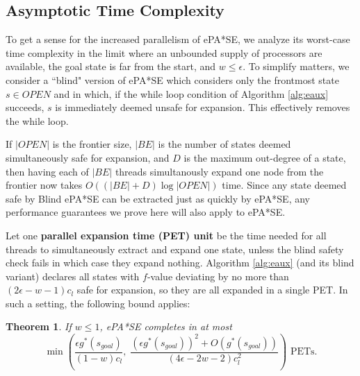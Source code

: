 \documentclass[letterpaper]{article}
\newtheorem{thm}{Theorem}
\begin{document}
\subsection{Asymptotic Time Complexity}

To get a sense for the increased parallelism of ePA*SE, we analyze its worst-case time complexity in the limit where an unbounded supply of processors are available, the goal state is far from the start, and $w \le \epsilon$. To simplify matters, we consider a ``blind" version of ePA*SE which considers only the frontmost state $s\in OPEN$ and in which, if the while loop condition of Algorithm \ref{alg:eaux} succeeds, $s$ is immediately deemed unsafe for expansion. This effectively removes the while loop. 

If $|OPEN|$ is the frontier size, $|BE|$ is the number of states deemed simultaneously safe for expansion, and $D$ is the maximum out-degree of a state, then having each of $|BE|$ threads simultanously expand one node from the frontier now takes $O\left((|BE|+D)\log|OPEN|\right)$ time. Since any state deemed safe by Blind ePA*SE can be extracted just as quickly by ePA*SE, any performance guarantees we prove here will also apply to ePA*SE.

Let one \textbf{parallel expansion time (PET) unit} be the time needed for all threads to simultaneously extract and expand one state, unless the blind safety check fails in which case they expand nothing. Algorithm \ref{alg:eaux} (and its blind variant) declares all states with $f$-value deviating by no more than $(2\epsilon-w-1)c_l$ safe for expansion, so they are all expanded in a single PET. In such a setting, the following bound applies:

\begin{thm}
\label{thm:depth}
If $w \le 1$, ePA*SE completes in at most
\[\min\left(\frac{\epsilon g^*(s_{goal})}{(1-w)c_l},\;
\frac{\left(\epsilon g^*(s_{goal})\right)^2 + O(g^*(s_{goal})) }{(4\epsilon-2w-2)c_l^2} \right)\text{ PETs.}\]
\end{thm}
\end{document}
